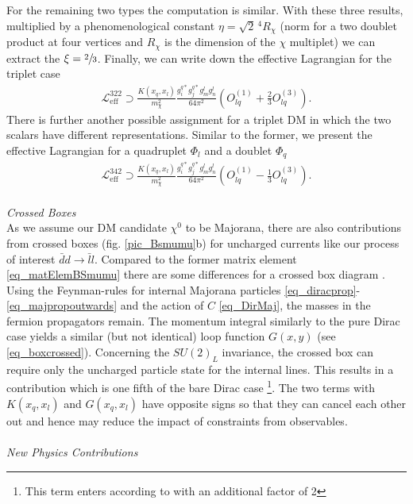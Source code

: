 For the remaining two types the computation is similar. With these three results, multiplied by a 
phenomenological constant $\eta=\sqrt{2}\,^4 R_\chi$ (norm for a two doublet product at four vertices and $R_\chi$ is the dimension of the $\chi$ multiplet) 
we can extract the $\xi=\sfrac23$. Finally, we can write down the effective Lagrangian for the triplet case
\begin{align}
 \mathcal{L}^{{322}}_\text{eff} \supset \frac{K(x_q,x_l)}{m_\chi^2}\frac{g_i^{q*} g_j^{q*} g_m^l g_n^l}{64\pi^2}\left(O_{lq}^{(1)} + \frac23 O_{lq}^{(3)}\right).
 \label{eq_LagBSmumuModB}
\end{align}
There is further another possible assignment for a triplet DM in which the two scalars have different representations. Similar to the former, we
present the effective Lagrangian for a quadruplet $\Phi_l$ and a doublet $\Phi_q$
\begin{align}
 \mathcal{L}^{{342}}_\text{eff} \supset \frac{K(x_q,x_l)}{m_\chi^2}\frac{g_i^{q*} g_j^{q*} g_m^l g_n^l}{64\pi^2}\left(O_{lq}^{(1)} - \frac13 O_{lq}^{(3)}\right).
 \label{eq_LagBSmumuModC}
\end{align}
\\ \textit{Crossed Boxes}\\
\noindent As we assume our DM candidate $\chi^0$ to be Majorana, there are also contributions from crossed boxes (fig. \ref{pic_Bsmumu}b) for uncharged
currents like our process of interest $\bar d d\rightarrow \bar l l$. Compared to the former matrix element \eqref{eq_matElemBSmumu} there are
some differences for a crossed box diagram \cite{1411.6743}. Using the Feynman-rules for internal Majorana particles 
\eqref{eq_diracprop}-\eqref{eq_majpropoutwards} and the action of $C$ \eqref{eq_DirMaj}, 
the masses in the fermion propagators remain. The momentum integral similarly to the pure Dirac case yields
a similar (but not identical) loop function $G(x,y)$ (see \eqref{eq_boxcrossed}).
Concerning the $SU(2)_L$ invariance, the crossed box can require only the uncharged particle state for the internal lines. 
This results in a contribution which is one fifth of the bare Dirac case \footnote[1]{This term enters according to \cite{1608.07832} with an additional 
factor of 2}. The two terms with $K(x_q,x_l)$ and $G(x_q,x_l)$ have opposite signs so 
that they can cancel each other out and hence may reduce the impact of constraints from observables.\\
\\ \textit{New Physics Contributions}\\
